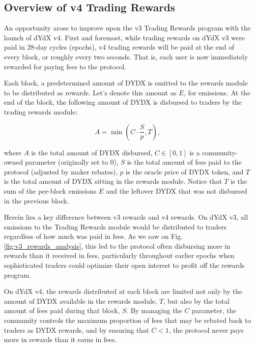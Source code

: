     \subsection{Overview of v4 Trading Rewards}
    
        An opportunity arose to improve upon the v3 Trading Rewards program with the launch of dYdX v4. First and foremost, while trading rewards on dYdX v3 were paid in 28-day cycles (epochs), v4 trading rewards will be paid at the end of every block, or roughly every two seconds. That is, each user is now immediately rewarded for paying fees to the protocol.

        Each block, a predetermined amount of DYDX is emitted to the rewards module to be distributed as rewards. Let's denote this amount as $E$, for emissions. At the end of the block, the following amount of DYDX is disbursed to traders by the trading rewards module:

        \begin{equation}
            A = \min{\left(C \cdot \frac{S}{p}, T\right)},
        \end{equation}

        where $A$ is the total amount of DYDX disbursed, $C \in [0, 1]$ is a community-owned parameter (originally set to $0$), $S$ is the total amount of fees paid to the protocol (adjusted by maker rebates), $p$ is the oracle price of DYDX token, and $T$ is the total amount of DYDX sitting in the rewards module. Notice that $T$ is the sum of the per-block emissions $E$ and the leftover DYDX that was not disbursed in the previous block.

        Herein lies a key difference between v3 rewards and v4 rewards. On dYdX v3, all emissions to the Trading Rewards module would be distributed to traders regardless of how much was paid in fees. As we saw on Fig. \ref{fig:v3_rewards_analysis}, this led to the protocol often disbursing more in rewards than it received in fees, particularly throughout earlier epochs when sophisticated traders could optimize their open interest to profit off the rewards program. 

        On dYdX v4, the rewards distributed at each block are limited not only by the amount of DYDX available in the rewards module, $T$, but also by the total amount of fees paid during that block, $S$. By managing the $C$ parameter, the community controls the maximum proportion of fees that may be rebated back to traders as DYDX rewards, and by ensuring that $C < 1$, the protocol never pays more in rewards than it earns in fees. 


